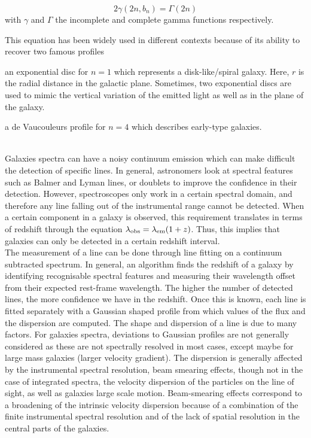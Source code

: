\begin{equation}
2 \gamma (2n, b_n) = \Gamma (2n)
\end{equation}
with $\gamma$ and $\Gamma$ the incomplete and complete gamma functions respectively.

This equation has been widely used in different contexts because of its ability to recover two famous profiles
\begin{enumerate*}[label={(\alph*)}]
    \item an exponential disc for $n = 1$ which represents a disk-like/spiral galaxy. Here, $r$ is the radial distance in the galactic plane. Sometimes, two exponential discs are used to mimic the vertical variation of the emitted light as well as in the plane of the galaxy. 
    \item a de Vaucouleurs profile for $n = 4$ which describes early-type galaxies.
\end{enumerate*}\\

Galaxies spectra can have a noisy continuum emission which can make difficult the detection of specific lines. In general, astronomers look at spectral features such as Balmer and Lyman lines, or doublets to improve the confidence in their detection. However, spectroscopes only work in a certain spectral domain, and therefore any line falling out of the instrumental range cannot be detected. When a certain component in a galaxy is observed, this requirement translates in terms of redshift through the equation $\lambda_{\rm{obs}} = \lambda_{\rm{em}} ( 1+ z)$. Thus, this implies that galaxies can only be detected in a certain redshift interval. \\

The measurement of a line can be done through line fitting on a continuum subtracted spectrum. In general, an algorithm finds the redshift of a galaxy by identifying recognisable spectral features and measuring their wavelength offset from their expected rest-frame wavelength. The higher the number of detected lines, the more confidence we have in the redshift. Once this is known, each line is fitted separately with a Gaussian shaped profile from which values of the flux and the dispersion are computed. The shape and dispersion of a line is due to many factors. For galaxies spectra, deviations to Gaussian profiles are not generally considered as these are not spectrally resolved in most cases, except maybe for large mass galaxies (larger velocity gradient). The dispersion is generally affected by the instrumental spectral resolution, beam smearing effects, though not in the case of integrated spectra, the velocity dispersion of the particles on the line of sight, as well as galaxies large scale motion. Beam-smearing effects correspond to a broadening of the intrinsic velocity dispersion because of a combination of the finite instrumental spectral resolution and of the lack of spatial resolution in the central parts of the galaxies. \\


